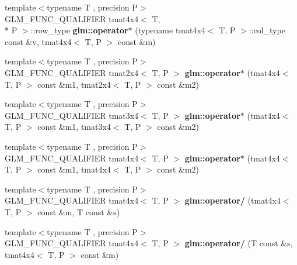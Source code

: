 \begin{DoxyCompactItemize}
\item 
\hypertarget{namespaceglm_a03183ab7d846537945d1022a78f6a34f}{{\footnotesize template$<$typename T , precision P$>$ }\\G\-L\-M\-\_\-\-F\-U\-N\-C\-\_\-\-Q\-U\-A\-L\-I\-F\-I\-E\-R tmat4x4$<$ T, \\*
P $>$\-::row\-\_\-type {\bfseries glm\-::operator$\ast$} (typename tmat4x4$<$ T, P $>$\-::col\-\_\-type const \&v, tmat4x4$<$ T, P $>$ const \&m)}\label{namespaceglm_a03183ab7d846537945d1022a78f6a34f}

\item 
\hypertarget{namespaceglm_a90a5edbd0b42811831af06c6aacd4a8e}{{\footnotesize template$<$typename T , precision P$>$ }\\G\-L\-M\-\_\-\-F\-U\-N\-C\-\_\-\-Q\-U\-A\-L\-I\-F\-I\-E\-R tmat2x4$<$ T, P $>$ {\bfseries glm\-::operator$\ast$} (tmat4x4$<$ T, P $>$ const \&m1, tmat2x4$<$ T, P $>$ const \&m2)}\label{namespaceglm_a90a5edbd0b42811831af06c6aacd4a8e}

\item 
\hypertarget{namespaceglm_a1c04f769e6bde60bd80b3173b519b741}{{\footnotesize template$<$typename T , precision P$>$ }\\G\-L\-M\-\_\-\-F\-U\-N\-C\-\_\-\-Q\-U\-A\-L\-I\-F\-I\-E\-R tmat3x4$<$ T, P $>$ {\bfseries glm\-::operator$\ast$} (tmat4x4$<$ T, P $>$ const \&m1, tmat3x4$<$ T, P $>$ const \&m2)}\label{namespaceglm_a1c04f769e6bde60bd80b3173b519b741}

\item 
\hypertarget{namespaceglm_a6dd36bf40e677eefd6f3e2acf88a2cf6}{{\footnotesize template$<$typename T , precision P$>$ }\\G\-L\-M\-\_\-\-F\-U\-N\-C\-\_\-\-Q\-U\-A\-L\-I\-F\-I\-E\-R tmat4x4$<$ T, P $>$ {\bfseries glm\-::operator$\ast$} (tmat4x4$<$ T, P $>$ const \&m1, tmat4x4$<$ T, P $>$ const \&m2)}\label{namespaceglm_a6dd36bf40e677eefd6f3e2acf88a2cf6}

\item 
\hypertarget{namespaceglm_ae255ad250d33a8cfb077044ce0950c27}{{\footnotesize template$<$typename T , precision P$>$ }\\G\-L\-M\-\_\-\-F\-U\-N\-C\-\_\-\-Q\-U\-A\-L\-I\-F\-I\-E\-R tmat4x4$<$ T, P $>$ {\bfseries glm\-::operator/} (tmat4x4$<$ T, P $>$ const \&m, T const \&s)}\label{namespaceglm_ae255ad250d33a8cfb077044ce0950c27}

\item 
\hypertarget{namespaceglm_a061e49063426cd16bad20d2916f281ca}{{\footnotesize template$<$typename T , precision P$>$ }\\G\-L\-M\-\_\-\-F\-U\-N\-C\-\_\-\-Q\-U\-A\-L\-I\-F\-I\-E\-R tmat4x4$<$ T, P $>$ {\bfseries glm\-::operator/} (T const \&s, tmat4x4$<$ T, P $>$ const \&m)}\label{namespaceglm_a061e49063426cd16bad20d2916f281ca}


\end{DoxyCompactItemize}
